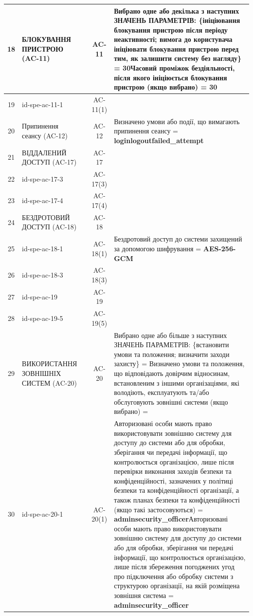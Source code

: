 \documentclass[10pt]{article}
\begin{document}
\begin{longtable}{|c|>{\raggedright\arraybackslash}p{2.5cm}|>{\raggedright\arraybackslash}p{4.5cm}|c|>{\raggedright\arraybackslash}p{4.5cm}|}
18 & БЛОКУВАННЯ ПРИСТРОЮ (AC-11) &  & AC-11 & Вибрано одне або декілька з наступних ЗНАЧЕНЬ ПАРАМЕТРІВ: \{ініціювання блокування пристрою після періоду неактивності; вимога до користувача ініціювати блокування пристрою перед тим, як залишити систему без нагляду\} = \textbf{30}\newline Часовий проміжок бездіяльності, після якого ініціюється блокування пристрою (якщо вибрано) = \textbf{30} \\ \hline
19 & id-spe-ac-11-1 &  & AC-11(1) &  \\ \hline
20 & Припинення сеансу (AC-12) &  & AC-12 & Визначено умови або події, що вимагають припинення сеансу = \textbf{loginlogoutfailed\_\allowbreak{}attempt} \\ \hline
21 & ВІДДАЛЕНИЙ ДОСТУП (AC-17) &  & AC-17 &  \\ \hline
22 & id-spe-ac-17-3 &  & AC-17(3) &  \\ \hline
23 & id-spe-ac-17-4 &  & AC-17(4) &  \\ \hline
24 & БЕЗДРОТОВИЙ ДОСТУП (AC-18) &  & AC-18 &  \\ \hline
25 & id-spe-ac-18-1 &  & AC-18(1) & Бездротовий доступ до системи захищений за допомогою шифрування = \textbf{AES-256-GCM} \\ \hline
26 & id-spe-ac-18-3 &  & AC-18(3) &  \\ \hline
27 & id-spe-ac-19 &  & AC-19 &  \\ \hline
28 & id-spe-ac-19-5 &  & AC-19(5) &  \\ \hline
29 & ВИКОРИСТАННЯ ЗОВНІШНІХ СИСТЕМ (AC-20) &  & AC-20 & Вибрано одне або більше з наступних ЗНАЧЕНЬ ПАРАМЕТРІВ: \{встановити умови та положення; визначити заходи захисту\} = \textbf{}\newline Визначено умови та положення, що відповідають довірчим відносинам, встановленим з іншими організаціями, які володіють, експлуатують та/або обслуговують зовнішні системи (якщо вибрано) = \textbf{} \\ \hline
30 & id-spe-ac-20-1 &  & AC-20(1) & Авторизовані особи мають право використовувати зовнішню систему для доступу до системи або для обробки, зберігання чи передачі інформації, що контролюється організацією, лише після перевірки виконання заходів безпеки та конфіденційності, зазначених у політиці безпеки та конфіденційності організації, а також планах безпеки та конфіденційності (якщо такі застосовуються) = \textbf{adminsecurity\_\allowbreak{}officer}\newline Авторизовані особи мають право використовувати зовнішню систему для доступу до системи або для обробки, зберігання чи передачі інформації, що контролюється організацією, лише після збереження погоджених угод про підключення або обробку системи з структурою організації, на якій розміщена зовнішня система = \textbf{adminsecurity\_\allowbreak{}officer} \\ \hline

\end{longtable}
\end{document}
